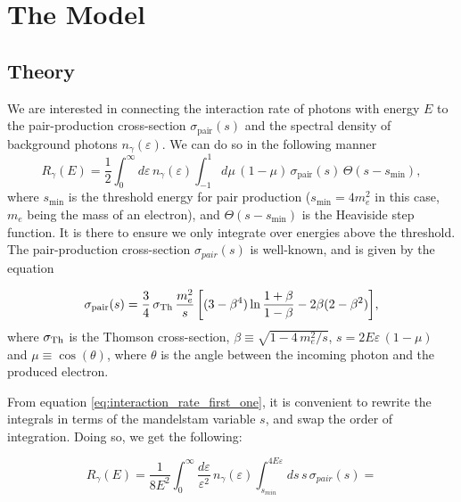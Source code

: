 \chapter{The Model}
\label{chap:The Model}

\section{Theory}

We are interested in connecting the interaction rate of photons with energy $E$ to the pair-production cross-section $\sigma_{\text{pair}}(s)$ and the spectral density of background photons $n_{\gamma}(\varepsilon)$. We can do so in the following manner\begin{equation}
    R_{\gamma}(E) = \frac{1}{2}\int_{0}^{\infty}d\varepsilon \,n_{\gamma}(\varepsilon)\int_{-1}^{1}d\mu\,(1-\mu)\,\sigma_{\text{pair}}(s)\,\Theta(s-s_{\min}),
    \label{eq:interaction_rate_first_one}
\end{equation} where $s_{\min}$ is the threshold energy for pair production ($s_{\min} = 4m_e^2$ in this case, $m_e$ being the mass of an electron), and $\Theta(s-s_{\min})$ is the Heaviside step function. It is there to ensure we only integrate over energies above the threshold. The pair-production cross-section $\sigma_{pair}(s)$ is well-known, and is given by the equation

\begin{equation}
    \sigma_{\rm pair}(s)=\frac{3}{4}\,\sigma_{{\rm Th}}\, \frac{m_e^2}{s}
     \left[(3-\beta^{4})\ln\frac{1+\beta}{1-\beta}-2\beta(2-\beta^{2})\right]\!,
    \label{eq:sigma-pair}
\end{equation} where $\sigma_{\rm Th}$ is the Thomson cross-section, $\beta \equiv \sqrt{1-4\,m_e^2/s}$, $s = 2E\varepsilon\,(1-\mu)$ and $\mu \equiv \cos(\theta)$, where $\theta$ is the angle between the incoming photon and the produced electron.

From equation \eqref{eq:interaction_rate_first_one}, it is convenient to rewrite the integrals in terms of the mandelstam variable $s$, and swap the order of integration. Doing so, we get the following:

\begin{equation*}
    R_{\gamma}(E) = \frac{1}{8E^2}\int_{0}^{\infty}\frac{d\varepsilon}{\varepsilon^2}\,n_{\gamma}(\varepsilon)\int_{s_{min}}^{4E\varepsilon}ds\,s\,\sigma_{pair}(s) =
    \label{eq:interaction_rate_second_one}
\end{equation*}

